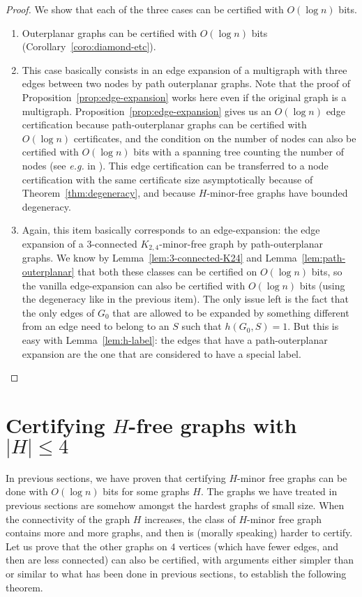 \documentclass[a4paper,thm-restate,USenglish]{lipics-v2019}
\begin{document}
\begin{proof}
We show that each of the three cases can be certified with $O(\log n)$ bits.
\begin{enumerate}
\item Outerplanar graphs can be certified with $O(\log n)$ bits (Corollary~\ref{coro:diamond-etc}).
\item This case basically consists in an edge expansion of a multigraph with three edges between two nodes by path outerplanar graphs. Note that the proof of Proposition~\ref{prop:edge-expansion} works here even if the original graph is a multigraph. Proposition~\ref{prop:edge-expansion} gives us an $O(\log n)$ edge certification because path-outerplanar graphs can be certified with $O(\log n)$ certificates, and the condition on the number of nodes can also be certified with $O(\log n)$ bits with a spanning tree counting the number of nodes (see \emph{e.g.} in \cite{Feuilloley19}). 
This edge certification can be transferred to a node certification with the same certificate size asymptotically because of Theorem~\ref{thm:degeneracy}, and because $H$-minor-free graphs have bounded degeneracy.
\item Again, this item basically corresponds to an edge-expansion: the edge expansion of a 3-connected $K_{2,4}$-minor-free graph by path-outerplanar graphs. We know by Lemma~\ref{lem:3-connected-K24} and Lemma~\ref{lem:path-outerplanar} that both these classes can be certified on $O(\log n)$ bits, so the vanilla edge-expansion can also be certified with $O(\log n)$ bits (using the degeneracy like in the previous item). 
The only issue left is the fact that the only edges of $G_0$ that are allowed to be expanded by something different from an edge need to belong to an $S$ such that $h(G_0,S)=1$. But this is easy with Lemma~\ref{lem:h-label}: the edges that have a path-outerplanar expansion are the one that are considered to have a special label.\qedhere
\end{enumerate}
\end{proof}


\section{Certifying $H$-free graphs with $|H| \le 4$}
\label{sec:4vertices}

In previous sections, we have proven that certifying $H$-minor free graphs can be done with $O(\log n)$ bits for some graphs $H$. 
The graphs we have treated in previous sections are somehow amongst the hardest graphs of small size. When the connectivity of the graph $H$ increases, the class of $H$-minor free graph contains more and more graphs, and then is (morally speaking) harder to certify.
Let us prove that the other graphs on $4$ vertices (which have fewer edges, and then are less connected) can also be certified, with arguments either simpler than or similar to what has been done in previous sections, to establish the following theorem.
\end{document}
